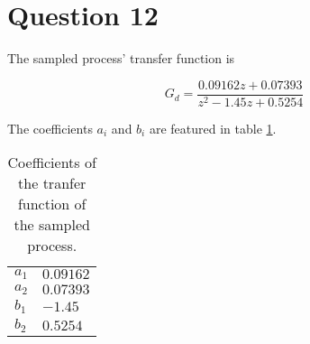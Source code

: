 \section{Question 12}

The sampled process' transfer function is

\begin{equation}
  G_d = \dfrac{0.09162z + 0.07393}{z^2 - 1.45z + 0.5254}
\end{equation}

The coefficients $a_i$ and $b_i$ are featured in table \ref{tbl:12}.

\begin{table}[H]\centering
  \begin{tabular}{l|l}
  $a_1$ & $0.09162$ \\
  $a_2$ & $0.07393$ \\
  $b_1$ & $-1.45$   \\
  $b_2$ & $0.5254$  \\
  \end{tabular}
  \caption{Coefficients of the tranfer function of the sampled process.}
  \label{tbl:12}
\end{table}
